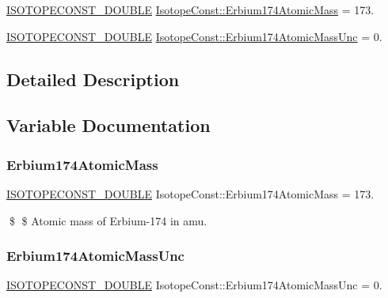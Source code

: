 \begin{DoxyCompactItemize}
\item 
\mbox{\hyperlink{group___isotope_const-_macros_ga8f45a7272ce02c0b4c65c44636ed719a}{I\+S\+O\+T\+O\+P\+E\+C\+O\+N\+S\+T\+\_\+\+D\+O\+U\+B\+LE}} \mbox{\hyperlink{group___isotope_const-_erbium-_er174_ga88d12d97cb271292f71328e3b6bf6ee1}{Isotope\+Const\+::\+Erbium174\+Atomic\+Mass}} = 173.
\item 
\mbox{\hyperlink{group___isotope_const-_macros_ga8f45a7272ce02c0b4c65c44636ed719a}{I\+S\+O\+T\+O\+P\+E\+C\+O\+N\+S\+T\+\_\+\+D\+O\+U\+B\+LE}} \mbox{\hyperlink{group___isotope_const-_erbium-_er174_ga2cb8a112bf4c0d17306974ec1bb60e1a}{Isotope\+Const\+::\+Erbium174\+Atomic\+Mass\+Unc}} = 0.
\end{DoxyCompactItemize}


\subsection{Detailed Description}


\subsection{Variable Documentation}
\mbox{\label{group___isotope_const-_erbium-_er174_ga88d12d97cb271292f71328e3b6bf6ee1}} 
\subsubsection{\texorpdfstring{Erbium174\+Atomic\+Mass}{Erbium174AtomicMass}}
{\footnotesize\ttfamily \mbox{\hyperlink{group___isotope_const-_macros_ga8f45a7272ce02c0b4c65c44636ed719a}{I\+S\+O\+T\+O\+P\+E\+C\+O\+N\+S\+T\+\_\+\+D\+O\+U\+B\+LE}} Isotope\+Const\+::\+Erbium174\+Atomic\+Mass = 173.}

\$ \$ Atomic mass of Erbium-\/174 in amu. \mbox{\label{group___isotope_const-_erbium-_er174_ga2cb8a112bf4c0d17306974ec1bb60e1a}} 
\subsubsection{\texorpdfstring{Erbium174\+Atomic\+Mass\+Unc}{Erbium174AtomicMassUnc}}
{\footnotesize\ttfamily \mbox{\hyperlink{group___isotope_const-_macros_ga8f45a7272ce02c0b4c65c44636ed719a}{I\+S\+O\+T\+O\+P\+E\+C\+O\+N\+S\+T\+\_\+\+D\+O\+U\+B\+LE}} Isotope\+Const\+::\+Erbium174\+Atomic\+Mass\+Unc = 0.}

